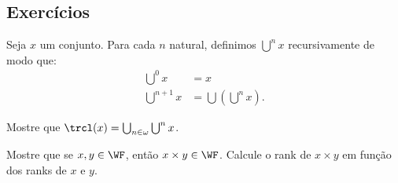 \subsection*{Exercícios}
\begin{exercise}[$\ZFmP$]
    Seja $x$ um conjunto.
    Para cada $n$ natural, definimos $\bigcup^n x$ recursivamente de modo que:
    \begin{align*}
        \bigcup^0 x&=x\\
        \bigcup^{n+1} x&=\bigcup(\bigcup^n x).
    \end{align*}    

    Mostre que $\trcl(x)=\bigcup_{n\in\omega}\bigcup^n x$.
\end{exercise}

\begin{exercise}[$\ZFmP$]
    Mostre que se $x, y \in \WF$, então $x\times y\in \WF$.
    Calcule o rank de $x\times y$ em função dos ranks de $x$ e $y$.
\end{exercise}